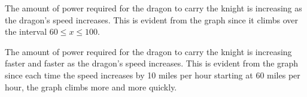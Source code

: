 \begin{solution}

\begin{center}
\end{center}

\begin{parts}
        \item The amount of power required for the dragon to carry the knight is increasing as the dragon's speed increases. This is evident from the graph since it climbs over the interval $60\leq x \leq 100$.
        \item The amount of power required for the dragon to carry the knight is increasing faster and faster as the dragon's speed increases. This is evident from the graph since each time the speed increases by 10 miles per hour starting at 60 miles per hour, the graph climbs more and more quickly.
\end{parts}
\end{solution}
